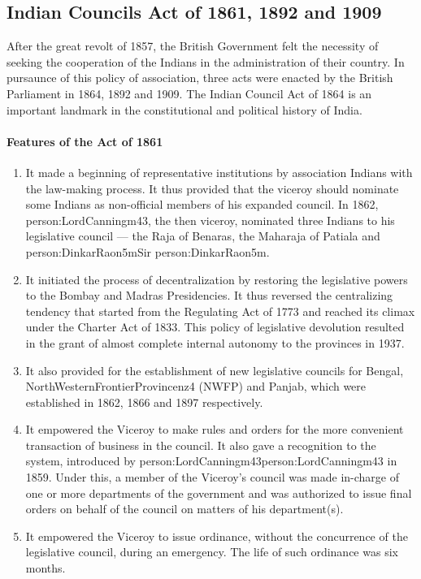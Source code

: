 \subsection{Indian Councils Act of 1861, 1892 and 1909}

After the great revolt of 1857, the British Government felt the necessity of seeking the cooperation of the Indians in the administration of their country. In pursaunce of this policy of association, three acts were enacted by the British Parliament in 1864, 1892 and 1909. The Indian Council Act of 1864 is an important landmark in the constitutional and political history of India.

\paragraph{Features of the Act of 1861}
\begin{enumerate}
  \item It made a beginning of representative institutions by association Indians with the law-making process. It thus provided that the viceroy should nominate some Indians as non-official members of his expanded council. In 1862, \gls{person:LordCanningm43}, the then viceroy, nominated three Indians to his legislative council — the Raja of Benaras, the Maharaja of Patiala and \gls{person:DinkarRaon5m}Sir \gls{person:DinkarRaon5m}.
  \item It initiated the process of decentralization by restoring the legislative powers to the Bombay and Madras Presidencies. It thus reversed the centralizing tendency that started from the Regulating Act of 1773 and reached its climax under the Charter Act of 1833. This policy of legislative devolution resulted in the grant of almost complete internal autonomy to the provinces in 1937.
  \item It also provided for the establishment of new legislative councils for Bengal, \gls{NorthWesternFrontierProvincenz4} (NWFP) and Panjab, which were established in 1862, 1866 and 1897 respectively.
  \item It empowered the Viceroy to make rules and orders for the more convenient transaction of business in the council. It also gave a recognition to the   system, introduced by \gls{person:LordCanningm43}\gls{person:LordCanningm43} in 1859. Under this, a member of the Viceroy's council was made in-charge of one or more departments of the government and was authorized to issue final orders on behalf of the council on matters of his department(s).
  \item It empowered the Viceroy to issue ordinance, without the concurrence of the legislative council, during an emergency. The life of such ordinance was six months.
\end{enumerate}

